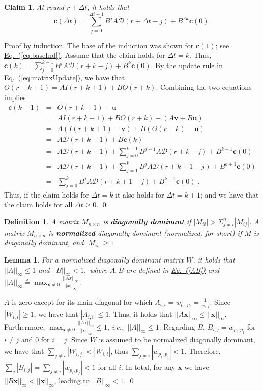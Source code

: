 \documentclass[preprint,12pt]{elsarticle}
\newtheorem{lemma}{Lemma}
\newtheorem{definition}{Definition}
\newtheorem{claim}{Claim}
\newenvironment{proof}{\noindent{\bf Proof:~~}}{}
\newcommand{\ie}{\emph{i.e.,\ }}
\newcommand{\namedrefeq}[2]{\hyperref[#2]{#1~\mbox{\rm(\ref*{#2})}}}
\newcommand{\equationref}[1]{\namedrefeq{Eq.}{#1}}
\newcommand\norm[1]{\left|\left|#1\right|\right|}
\newcommand\normi[1]{\left|\left|#1\right|\right|_\infty}
\newcommand{\uu}{\mathbf{u}}
\newcommand{\vv}{\mathbf{v}}
\newcommand{\cc}{\mathbf{c}}
\newcommand{\xx}{\mathbf{x}}
\newcommand{\D}{\mathcal{D}}
\newcommand{\Ir}[1]{I(#1)}
\newcommand{\Or}[1]{O(#1)}
\begin{document}
\begin{claim}
At round $r+\Delta t$, it holds that \[ \cc(\Delta t)= \sum_{j=0}^{\Delta t-1} B^jA\D(r+\Delta t-j) + B^{\Delta t}\cc(0). \]
\end{claim}
\begin{proof}
  Proof by induction. The base of the induction was shown for $\cc(1)$; see \equationref{eq:baseInd}. Assume that the claim holds for $\Delta t =
  k$. Thus, $\cc(k)= \sum_{j=0}^{k-1} B^jA\D(r+k-j) + B^k\cc(0)$. By the update rule in
  \equationref{eq:matrixUpdate}, we have that $\Or{r+k+1} = A\Ir{r+k+1}
  + B\Or{r+k}$. Combining the two equations implies
  \begin{eqnarray*}\label{eq:norm}
    \cc(k+1) & = & \Or{r+k+1} - \uu \\
           & = & A\Ir{r+k+1} + B\Or{r+k} - (A\vv+B\uu)\\
           & = & A(\Ir{r+k+1}-\vv) + B(\Or{r+k} - \uu)\\
           & = & A\D(r+k+1) + B\cc(k)\\
           & = & A\D(r+k+1) + \sum_{j=0}^{k-1} B^{j+1}A\D(r+k-j) + B^{k+1}\cc(0)\\
           & = & A\D(r+k+1) + \sum_{j=1}^{k} B^jA\D(r+k+1-j) + B^{k+1}\cc(0)\\
           & = & \sum_{j=0}^{k} B^jA\D(r+k+1-j) + B^{k+1}\cc(0)\;.
  \end{eqnarray*}
  Thus, if the claim holds for $\Delta t=k$ it also holds for $\Delta t=k+1$;
  and we have that the claim holds for all $\Delta t \geq 0$.
  \qed
\end{proof}


\begin{definition}
  A matrix $M_{n \times n}$ is {\bf diagonally dominant} if
  $|M_{ii}| > \Sigma_{j \ne i}^n |M_{ij}| $. A matrix $M_{n \times n}$ is {\bf normalized} diagonally dominant (normalized, for short) if
  $M$ is diagonally dominant, and $|M_{ii}| \geq 1$.
\end{definition}

\begin{lemma}\label{claim:diag}
  For a normalized diagonally dominant matrix $W$, it holds that
  $\normi{A} \leq 1$ and $\normi{B} < 1,$ where $A,B$ are defined in \equationref{AB} and $\normi{A} \triangleq \max_{\xx \neq 0}\frac{\normi{Ax}}{\normi{x}}$.
\end{lemma}
\begin{proof}
  $A$ is zero except for its
  main diagonal for which $A_{i,i} = w_{p_i, p_i} =\frac{1}{w_{i,i}}$. Since $|W_{i,i}|
  \geq 1$, we have that $|A_{i,i}| \leq 1$. Thus, it holds that $\norm{A\xx}_\infty \leq \norm{\xx}_\infty$.
  Furthermore,
  $\max_{\xx \neq 0}\frac{\norm{A\xx}_\infty}{\norm{\xx}_\infty}
  \leq
  1$, \ie $\norm{A}_\infty \leq 1$. Regarding $B$, $B_{i,j} = w_{p_i, p_j}$ for $i
  \neq j$ and 0 for $i=j$. Since $W$ is assumed to be normalized diagonally dominant, we have
  that $\sum_{j \ne i} |W_{i,j}|< |W_{i,i}|$, thus $\sum_{j \ne i}
  |w_{p_i,p_j}|< 1$. Therefore, $\sum_j |B_{i,j}| = \sum_{j \ne i} |w_{p_i,p_j}|<
  1$ for all $i$. In total, for any $\xx$ we have
  $\norm{B\xx}_\infty < \norm{\xx}_\infty$, leading to $\norm{B}_\infty <
  1$.
\qed\end{proof}
\end{document}
